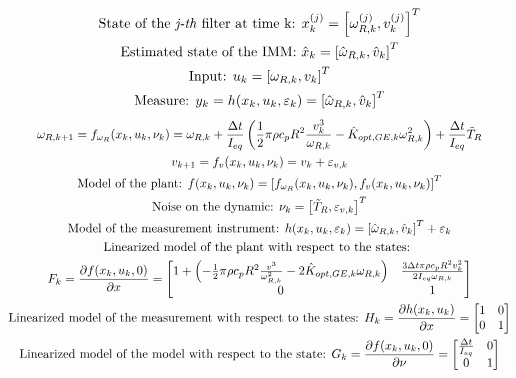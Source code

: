 \begin{gather}
  \text{State of the \textit{j-th} filter at time k: } x^{(j)}_{k} = \left[\omega_{R,k}^{(j)}, v_{k}^{(j)}\right]^T \\
  \text{Estimated state of the IMM: } \hat{x}_{k} = \left[\hat{\omega}_{R,k}, \hat{v}_{k}\right]^T \\
  \text{Input: } u_{k} = \left[\omega_{R,k}, v_{k}\right]^T \\
  \text{Measure: }  y_k = h(x_k, u_k, \varepsilon_k) = \left[\hat{\omega}_{R,k}, \hat{v}_{k}\right]^T 
\end{gather}
\begin{gather}
  \omega_{R,k+1} = f_{\omega_{R}}(x_k, u_k, \nu_k) = \omega_{R,k} + \frac{\Delta t}{I_{eq}} \left(\frac{1}{2}\pi\rho c_{p} R^2 \frac{v_k^3}{\omega_{R,k}} - \hat{K}_{opt,GE,k}\omega_{R,k}^2\right) + \frac{\Delta t}{I_{eq}}\tilde{T}_R\\
  v_{k+1} = f_{v}(x_k, u_k, \nu_k) = v_k + \varepsilon_{v,k} \\
  \text{Model of the plant: } f(x_k, u_k, \nu_k) = \left[f_{\omega_{R}}(x_k, u_k, \nu_k), f_{v}(x_k, u_k, \nu_k)\right]^T\\
  \text{Noise on the dynamic: } \nu_k = \left[\tilde{T}_R, \varepsilon_{v,k}\right]^T\\
  \text{Model of the measurement instrument: } h(x_k, u_k, \varepsilon_k) = \left[\hat{\omega}_{R,k}, \hat{v}_{k}\right]^T + \varepsilon_k\\
  \text{Linearized model of the plant with respect to the states: }\\\notag F_k = \frac{\partial f(x_k, u_k, 0)}{\partial x} = 
    \begin{bmatrix}
      1+\left(-\frac{1}{2}\pi\rho c_{p} R^2 \frac{v^3}{\omega_{R,k}^2}-2 \hat{K}_{opt,GE,k} \omega_{R,k}\right) & \frac{3\Delta t \pi \rho c_p R^2 v_k^2}{2 I_{eq} \omega_{R,k}}\\
      0 & 1 
    \end{bmatrix}\\
  \text{Linearized model of the measurement with respect to the states: }
  H_k = \frac{\partial h(x_k, u_k)}{\partial x}=
    \begin{bmatrix}
      1 & 0\\
      0 & 1 
    \end{bmatrix}\\
  \text{Linearized model of the model with respect to the state: } 
 G_k = \frac{\partial f(x_k, u_k, 0)}{\partial \nu} = 
  \begin{bmatrix}
    \frac{\Delta t}{I_{eq}} & 0\\
    0 & 1 
  \end{bmatrix}
\end{gather}
